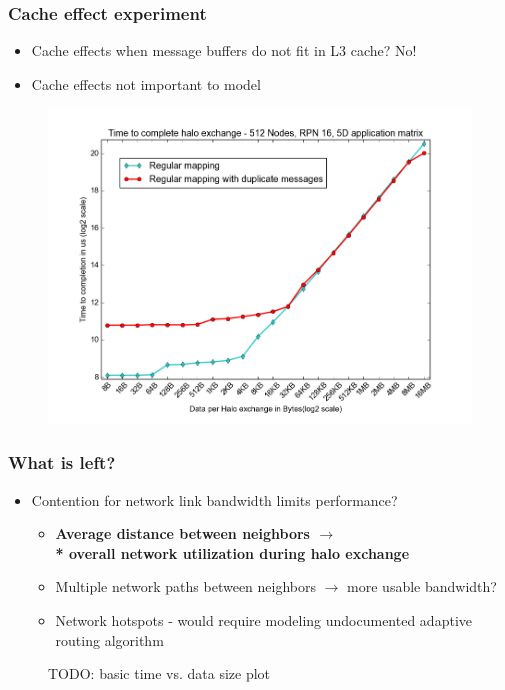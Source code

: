 \documentclass{beamer}
\begin{document}
\begin{frame}
\frametitle{Cache effect experiment}
\begin{itemize}
    \item Cache effects when message buffers do not fit in L3 cache? No!
    \item Cache effects not important to model
\end{itemize}
\begin{figure}
\includegraphics[width=0.8\linewidth]{../cache_duplicates_vs_regular.png}
\end{figure}
\end{frame}

\begin{frame}
\frametitle{What is left?}
\begin{itemize}
  \item Contention for network link bandwidth limits performance?
  \begin{itemize}
    \item \textbf{Average distance between neighbors $\rightarrow$ \\*
          overall network utilization during halo exchange}
    \item Multiple network paths between neighbors $\rightarrow$
           more usable bandwidth?
    \item Network hotspots - would require modeling undocumented
          adaptive routing algorithm
  \end{itemize}
\end{itemize}

\begin{figure}
TODO: basic time vs. data size plot
\end{figure}
\end{frame}
\end{document}
